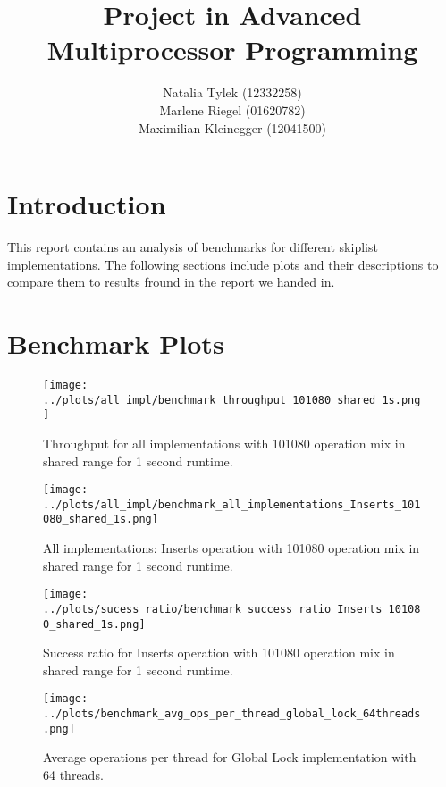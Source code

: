 \documentclass{article}
\begin{document}
\title{Project in Advanced Multiprocessor Programming}
\author{Natalia Tylek (12332258) \\Marlene Riegel (01620782) \\Maximilian Kleinegger (12041500)}
\maketitle

\section{Introduction}

This report contains an analysis of benchmarks for different skiplist implementations. 
The following sections include plots and their descriptions to compare them to results fround in the report we handed in.

\section{Benchmark Plots}

\begin{figure}[ht!]
  \centering
  \texttt{[image: ../plots/all\_impl/benchmark\_throughput\_101080\_shared\_1s.png]}
  \caption{Throughput for all implementations with 101080 operation mix in shared range for 1 second runtime.}
  \label{fig:all_impl_throughput}
\end{figure}


\begin{figure}[ht!]
  \centering
  \texttt{[image: ../plots/all\_impl/benchmark\_all\_implementations\_Inserts\_101080\_shared\_1s.png]}
  \caption{All implementations: Inserts operation with 101080 operation mix in shared range for 1 second runtime.}
  \label{fig:all_impl_inserts}
\end{figure}

\begin{figure}[ht!]
  \centering
  \texttt{[image: ../plots/sucess\_ratio/benchmark\_success\_ratio\_Inserts\_101080\_shared\_1s.png]}
  \caption{Success ratio for Inserts operation with 101080 operation mix in shared range for 1 second runtime.}
  \label{fig:success_ratio_inserts}
\end{figure}

\begin{figure}[ht!]
  \centering
  \texttt{[image: ../plots/benchmark\_avg\_ops\_per\_thread\_global\_lock\_64threads.png]}
  \caption{Average operations per thread for Global Lock implementation with 64 threads.}
  \label{fig:avg_ops_global_lock}
\end{figure}
\end{document}
